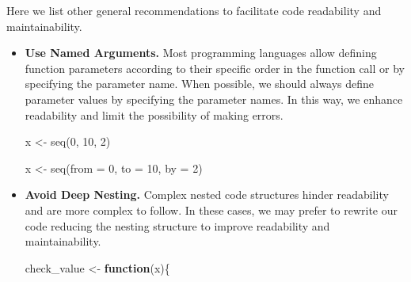\documentclass[
  11pt,
]{book}
\newenvironment{Shaded}{\begin{snugshade}}{\end{snugshade}}
\newcommand{\AttributeTok}[1]{\textcolor[rgb]{0.77,0.63,0.00}{#1}}
\newcommand{\ControlFlowTok}[1]{\textcolor[rgb]{0.13,0.29,0.53}{\textbf{#1}}}
\newcommand{\DecValTok}[1]{\textcolor[rgb]{0.00,0.00,0.81}{#1}}
\newcommand{\FunctionTok}[1]{\textcolor[rgb]{0.00,0.00,0.00}{#1}}
\newcommand{\NormalTok}[1]{#1}
\newcommand{\OtherTok}[1]{\textcolor[rgb]{0.56,0.35,0.01}{#1}}
\newenvironment{code-tex-bad}
  {\begingroup\definecolor{shadecolor}{RGB}{255, 189, 185}}
  {\endgroup}
\newenvironment{code-tex-good}
  {\begingroup\definecolor{shadecolor}{RGB}{224, 240, 227}}
  {\endgroup}
\begin{document}
Here we list other general recommendations to facilitate code readability and maintainability.

\begin{itemize}
\item
  \textbf{Use Named Arguments.} Most programming languages allow defining function parameters according to their specific order in the function call or by specifying the parameter name. When possible, we should always define parameter values by specifying the parameter names. In this way, we enhance readability and limit the possibility of making errors.

  \begin{code-tex-bad}

\begin{Shaded}
\begin{Highlighting}[]
\NormalTok{x }\OtherTok{\textless{}{-}} \FunctionTok{seq}\NormalTok{(}\DecValTok{0}\NormalTok{, }\DecValTok{10}\NormalTok{, }\DecValTok{2}\NormalTok{)}
\end{Highlighting}
\end{Shaded}

  \end{code-tex-bad}

  \begin{code-tex-good}

\begin{Shaded}
\begin{Highlighting}[]
\NormalTok{x }\OtherTok{\textless{}{-}} \FunctionTok{seq}\NormalTok{(}\AttributeTok{from =} \DecValTok{0}\NormalTok{, }\AttributeTok{to =} \DecValTok{10}\NormalTok{, }\AttributeTok{by =} \DecValTok{2}\NormalTok{)}
\end{Highlighting}
\end{Shaded}

  \end{code-tex-good}
\item
  \textbf{Avoid Deep Nesting.} Complex nested code structures hinder readability and are more complex to follow. In these cases, we may prefer to rewrite our code reducing the nesting structure to improve readability and maintainability.

  \begin{code-tex-bad}

\begin{Shaded}
\begin{Highlighting}[]
\NormalTok{check\_value }\OtherTok{\textless{}{-}} \ControlFlowTok{function}\NormalTok{(x)\{}


\end{Highlighting}
\end{Shaded}
\end{code-tex-bad}
\end{itemize}
\end{document}
